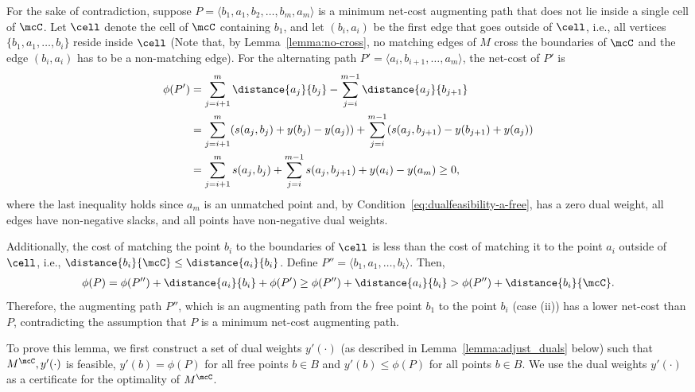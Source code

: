  For the sake of contradiction, suppose $P = \langle b_1, a_1, b_2, \ldots, b_m, a_m\rangle$ is a minimum net-cost augmenting path that does not lie inside a single cell of $\mcC$. Let $\cell$ denote the cell of $\mcC$ containing $b_1$, and let $(b_i, a_i)$ be the first edge that goes outside of $\cell$, i.e., all vertices $\{b_1, a_1,\ldots, b_i\}$ reside inside $\cell$ (Note that, by Lemma~\ref{lemma:no-cross}, no matching edges of $M$ cross the boundaries of $\mcC$ and the edge $(b_i, a_i)$ has to be a non-matching edge). For the alternating path $P'=\langle a_i, b_{i+1}, \ldots, a_{m}\rangle$, the net-cost of $P'$ is 
\begin{align*}
    \phi(P')&=\sum_{j=i+1}^m \distance{a_{j}}{b_{j}} - \sum_{j=i}^{m-1} \distance{a_{j}}{b_{j+1}}\\&= \sum_{j=i+1}^m (s(a_j,b_j) + y(b_j)-y(a_j)) + \sum_{j=i}^{m-1} (s(a_j,b_{j+1}) - y(b_{j+1})+y(a_j))\\ &= \sum_{j=i+1}^m s(a_j,b_j) + \sum_{j=i}^{m-1} s(a_j,b_{j+1}) + y(a_i) - y(a_m) \ge 0,
\end{align*}
where the last inequality holds since $a_m$ is an unmatched point and, by Condition~\eqref{eq:dualfeasibility-a-free}, has a zero dual weight, all edges have non-negative slacks, and all points have non-negative dual weights. 

Additionally, the cost of matching the point $b_i$ to the boundaries of $\cell$ is less than the cost of matching it to the point $a_i$ outside of $\cell$, i.e., $\distance{b_i}{\mcC}\le \distance{a_i}{b_i}$. Define $P''=\langle b_1, a_1, \ldots, b_i\rangle$. Then, 
\begin{align*}
    \phi(P) = \phi(P'')+\distance{a_i}{b_i} + \phi(P') \ge \phi(P'')+\distance{a_i}{b_i} > \phi(P'')+\distance{b_i}{\mcC}.
\end{align*}
Therefore, the augmenting path $P''$, which is an augmenting path from the free point $b_1$ to the point $b_i$ (case (ii)) has a lower net-cost than $P$, contradicting the assumption that $P$ is a minimum net-cost augmenting path. 


 To prove this lemma, we first construct a set of dual weights $y'(\cdot)$ (as described in Lemma~\ref{lemma:adjust_duals} below) such that $M^\mcC, y'(\cdot)$ is feasible, $y'(b)=\phi(P)$ for all free points $b\in B$ and $y'(b)\le \phi(P)$ for all points $b\in B$. We use the dual weights $y'(\cdot)$ as a certificate for the optimality of $M^\mcC$. 

